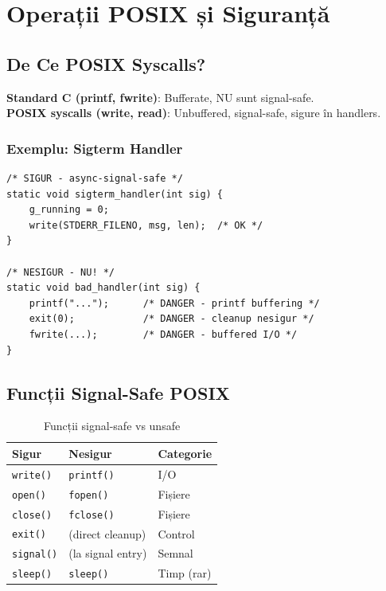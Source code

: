 \documentclass[12pt,a4paper,oneside]{book}
\newcommand{\conceptbox}[2]{
\begin{tcolorbox}[colback=lightblue,colframe=darkblue,title=#1]
#2
\end{tcolorbox}
}
\begin{document}
\newpage

\chapter{Operații POSIX și Siguranță}

\section{De Ce POSIX Syscalls?}

\conceptbox{POSIX vs Standard C}{
\textbf{Standard C (printf, fwrite)}: Bufferate, NU sunt signal-safe.
\\
\textbf{POSIX syscalls (write, read)}: Unbuffered, signal-safe, sigure în handlers.
}

\subsection{Exemplu: Sigterm Handler}

\begin{lstlisting}[caption=Handler SIGTERM cu POSIX]
/* SIGUR - async-signal-safe */
static void sigterm_handler(int sig) {
    g_running = 0;
    write(STDERR_FILENO, msg, len);  /* OK */
}

/* NESIGUR - NU! */
static void bad_handler(int sig) {
    printf("...");      /* DANGER - printf buffering */
    exit(0);            /* DANGER - cleanup nesigur */
    fwrite(...);        /* DANGER - buffered I/O */
}
\end{lstlisting}

\section{Funcții Signal-Safe POSIX}

\begin{table}[H]
\centering
\begin{tabularx}{\textwidth}{|l|l|l|}
\hline
\textbf{Sigur} & \textbf{Nesigur} & \textbf{Categorie} \\
\hline
\texttt{write()} & \texttt{printf()} & I/O \\
\texttt{open()} & \texttt{fopen()} & Fișiere \\
\texttt{close()} & \texttt{fclose()} & Fișiere \\
\texttt{exit()} & (direct cleanup) & Control \\
\texttt{signal()} & (la signal entry) & Semnal \\
\texttt{sleep()} & \texttt{sleep()} & Timp (rar) \\
\hline
\end{tabularx}
\caption{Funcții signal-safe vs unsafe}
\end{table}
\end{document}
